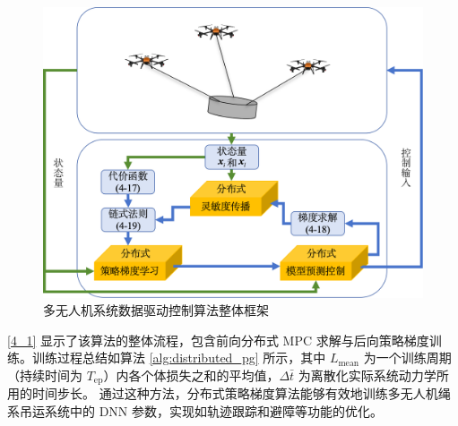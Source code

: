 \documentclass[lang=chs, degree=master, blindreview=false, winfonts=true]{yanputhesis}
\begin{document}
\begin{figure}[H]
	\centering
	\includegraphics[width=34pc]{picture/4_1.png} 
	\caption{多无人机系统数据驱动控制算法整体框架} 
	\label{4_1}
\end{figure}
\autoref{4_1} 显示了该算法的整体流程，包含前向分布式 MPC 求解与后向策略梯度训练。训练过程总结如算法 \ref{alg:distributed_pg} 所示，其中 $L_{\text{mean}}$ 为一个训练周期（持续时间为 $T_{\text{ep}}$）内各个体损失之和的平均值，$\Delta \bar{t}$ 为离散化实际系统动力学所用的时间步长。
通过这种方法，分布式策略梯度算法能够有效地训练多无人机绳系吊运系统中的 DNN 参数，实现如轨迹跟踪和避障等功能的优化。
\end{document}
